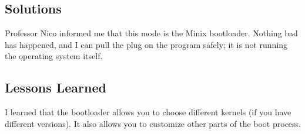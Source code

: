 \documentclass[11pt]{article}
\begin{document}
\subsection{Solutions}
Professor Nico informed me that this mode is the {\sc Minix} bootloader. Nothing bad has happened, and I can pull the plug on the program safely; it is not running the operating system itself.

\subsection{Lessons Learned}
I learned that the bootloader allows you to choose different kernels (if you have different versions). It also allows you to customize other parts of the boot process.
\end{document}
